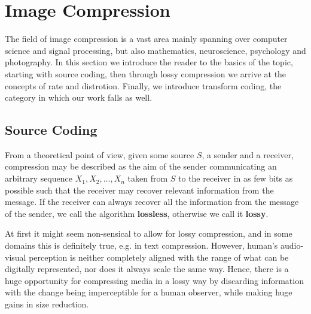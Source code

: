 \section{Image Compression}
\par
The field of image compression is a vast area mainly spanning over computer
science and signal processing, but also mathematics, neuroscience, psychology
and photography. In this section we introduce the reader to the basics of the
topic, starting with source coding, then through lossy compression we arrive at
the concepts of rate and distrotion. Finally, we introduce transform coding, the
category in which our work falls as well.

\subsection{Source Coding}
From a theoretical point of view, given some source $S$, a sender and a
receiver, compression may be described as the aim of the sender communicating an
arbitrary sequence $X_1, X_2, \hdots, X_n$ taken from $S$ to the receiver in as few bits
as possible such that the receiver may recover relevant information from the message.
If the receiver can always recover all the information from the message of the sender, we
call the algorithm \textbf{lossless}, otherwise we call it \textbf{lossy}. 
\par
At first it might seem non-sensical to allow for lossy compression, and in some
domains this is definitely true, e.g. in text compression. However, 
human's audio-visual perception is neither completely aligned with the range of
what can be digitally represented, nor does it always scale the same way. Hence,
there is a huge opportunity for compressing media in a lossy way by discarding
information with the change being imperceptible for a human observer, while
making huge gains in size reduction.
